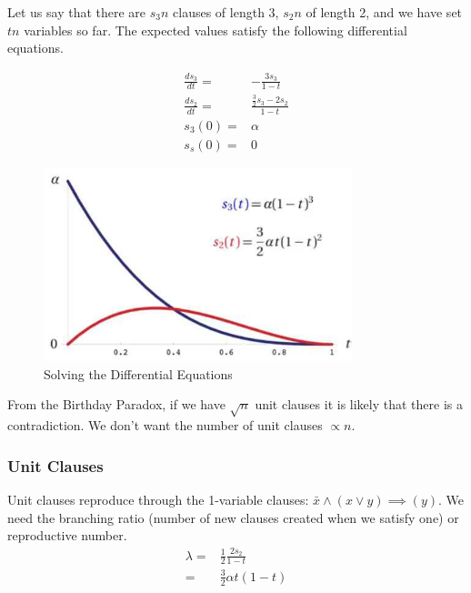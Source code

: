 \documentclass[]{article}
\begin{document}
Let us say that there are $s_3n$ clauses of length 3, $s_2n$ of length 2, and we have set $tn$ variables so far. The expected values satisfy the following differential equations.

\begin{align*}
	\frac{d s_3}{dt} =& - \frac{3 s_3}{1-t}\\
	\frac{d s_2}{dt} =& \frac{\frac{3}{2}s_3-2s_2}{1-t}\\
	s_3(0)=& \alpha\\
	s_s(0)=& 0
\end{align*}

\begin{figure}[H]
	\begin{center}
		\caption{Solving the Differential Equations}
		\includegraphics[width=0.8\textwidth]{solving-de}
	\end{center}
\end{figure}

From the Birthday Paradox, if we have $\sqrt{n}$ unit clauses it is likely that there is a contradiction. We don't want the number of unit clauses $\propto n$.

\subsubsection{Unit Clauses}

Unit clauses reproduce through the 1-variable clauses: $\bar{x}\land(x \lor y)\implies(y)$. We need the branching ratio (number of new clauses created when we satisfy one) or reproductive number.
\begin{align*}
	\lambda =& \frac{1}{2} \frac{2 s_2}{1-t}\\
	=& \frac{3}{2} \alpha t (1-t)
\end{align*}
\end{document}
